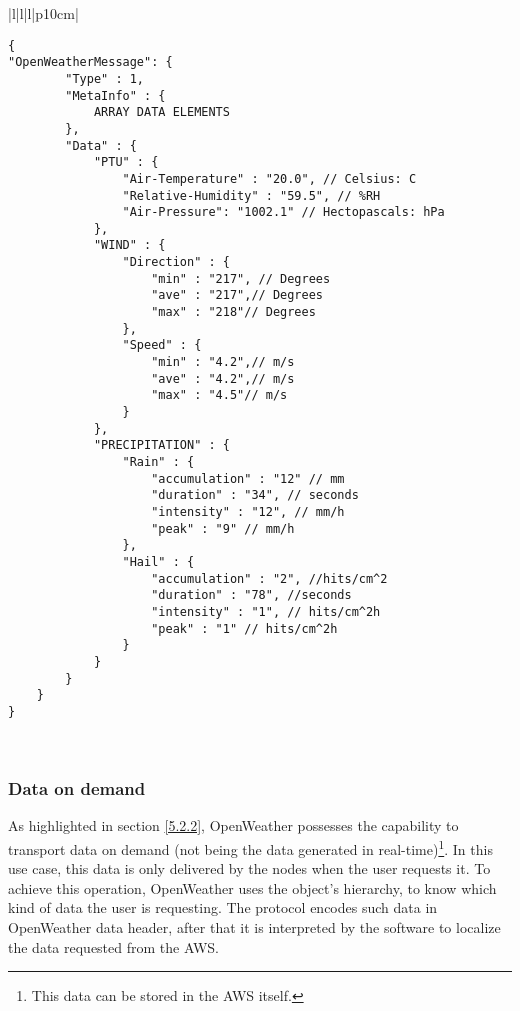 \begin{table}[H]
\centering
\begin{tabular}{|l|l|l|p{10cm}|}
\hline
\begin{minipage}[t]{\linewidth}
	\begin{verbatim}
{
"OpenWeatherMessage": {
        "Type" : 1,
        "MetaInfo" : {
            ARRAY DATA ELEMENTS
        },
        "Data" : { 
            "PTU" : {
                "Air-Temperature" : "20.0", // Celsius: C 
                "Relative-Humidity" : "59.5", // %RH 
                "Air-Pressure": "1002.1" // Hectopascals: hPa
            },
            "WIND" : {
                "Direction" : {
                    "min" : "217", // Degrees
                    "ave" : "217",// Degrees
                    "max" : "218"// Degrees
                },
                "Speed" : { 
                    "min" : "4.2",// m/s
                    "ave" : "4.2",// m/s
                    "max" : "4.5"// m/s
                }
            },
            "PRECIPITATION" : {
                "Rain" : {
                    "accumulation" : "12" // mm
                    "duration" : "34", // seconds
                    "intensity" : "12", // mm/h
                    "peak" : "9" // mm/h
                },
                "Hail" : {
                    "accumulation" : "2", //hits/cm^2
                    "duration" : "78", //seconds
                    "intensity" : "1", // hits/cm^2h
                    "peak" : "1" // hits/cm^2h
                }
            }
        }
    }
}   
      \end{verbatim}
\end{minipage} \\
\hline
\end{tabular}
\caption{Real-time data message of OpenWeather protocol.}
\label{dataoverview}
\end{table}

\subsubsection{Data on demand}

As highlighted in section \ref{5.2.2}, OpenWeather possesses the capability to transport data on demand (not being the data generated in real-time)\footnote{This data can be stored in the \gls{AWS} itself.}. In this use case, this data is only delivered by the nodes when the user requests it. To achieve this operation, OpenWeather uses the object's hierarchy, to know which kind of data the user is requesting. The protocol encodes such data in OpenWeather data header, after that it is interpreted by the software to localize the data requested from the \gls{AWS}.

